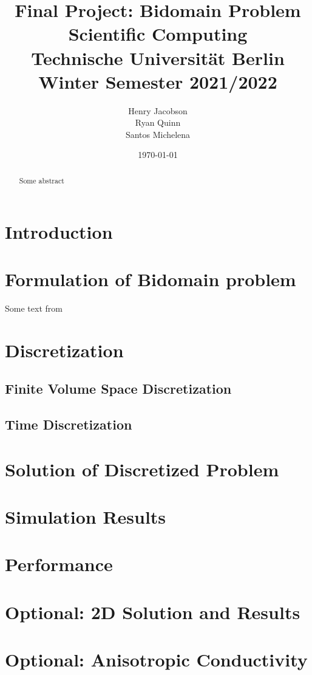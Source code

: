\documentclass{finalproject}
\title{Final Project: Bidomain Problem \\ \large{Scientific Computing \\ Technische Universität Berlin \\ Winter Semester 2021/2022}}
\author{Henry Jacobson\\Ryan Quinn\\Santos Michelena}
\date{\today}
\begin{document}
\maketitle

\begin{abstract} %
Some abstract
\end{abstract}

\section{Introduction} %
\section{Formulation of Bidomain problem}
Some text from \cite{eth_bou}
\section{Discretization}
\subsection{Finite Volume Space Discretization}
\subsection{Time Discretization}

\section{Solution of Discretized Problem}

\section{Simulation Results}

\section{Performance}

\section{Optional: 2D Solution and Results}
\section{Optional: Anisotropic Conductivity}
\end{document}
